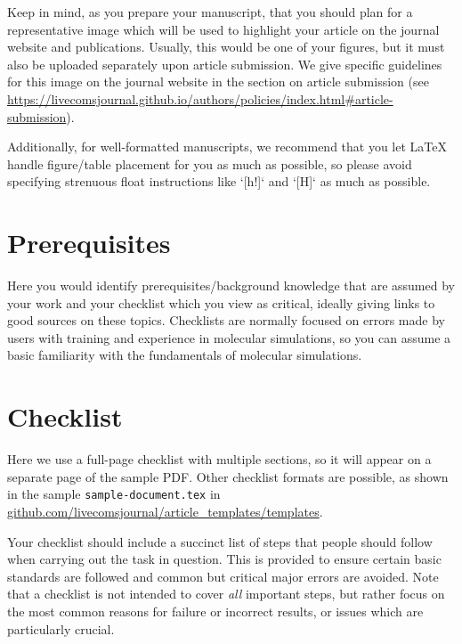 \documentclass[9pt,bestpractices]{livecoms}
\begin{document}
Keep in mind, as you prepare your manuscript, that you should plan for a representative image  which will be used to highlight your article on the journal website and publications. Usually, this would be one of your figures, but it must also be uploaded separately upon article submission. We give specific guidelines for this image on the journal website in the section on article submission (see \url{https://livecomsjournal.github.io/authors/policies/index.html#article-submission}).

Additionally, for well-formatted manuscripts, we recommend that you let LaTeX handle figure/table placement for you as much as possible, so please avoid specifying strenuous float instructions like `[h!]` and `[H]` as much as possible.

\section{Prerequisites}

Here you would identify prerequisites/background knowledge that are assumed by your work and your checklist which you view as critical, ideally giving links to good sources on these topics.
Checklists are normally focused on errors made by users with training and experience in molecular simulations, so you can assume a basic familiarity with the fundamentals of molecular simulations.

\section{Checklist}
Here we use a full-page checklist with multiple sections, so it will appear on a separate page of the sample PDF.
Other checklist formats are possible, as shown in the sample \texttt{sample-document.tex} in \url{github.com/livecomsjournal/article_templates/templates}.

Your checklist should include a succinct list of steps that people should follow when carrying out the task in question.
This is provided to ensure certain basic standards are followed and common but critical major errors are avoided.
Note that a checklist is not intended to cover \emph{all} important steps, but rather focus on the most common reasons for failure or incorrect results, or issues which are particularly crucial.


\end{document}
